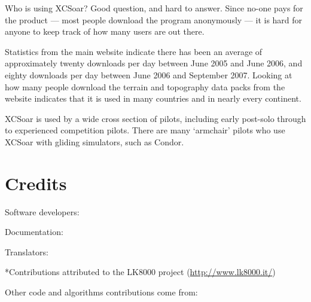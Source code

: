 Who is using XCSoar?  Good question, and hard to answer.  Since no-one
pays for the product --- most people download the program anonymously
--- it is hard for anyone to keep track of how many users are out
there.

Statistics from the main website indicate there has been an average of
approximately twenty downloads per day between June 2005 and June
2006, and eighty downloads per day between June 2006 and September
2007.  Looking at how many people download the terrain and topography
data packs from the website indicates that it is used in many
countries and in nearly every continent.

XCSoar is used by a wide cross section of pilots, including early
post-solo through to experienced competition pilots.  There are many
`armchair' pilots who use XCSoar with gliding simulators, such as
Condor.


\section{Credits}\label{sec:credits}

Software developers:
\begin{itemize}
  
\end{itemize}


Documentation:
\begin{itemize}
  
\end{itemize}


Translators:
\begin{itemize}
  
\end{itemize}
*Contributions attributed to the LK8000 project (\url{http://www.lk8000.it/})


Other code and algorithms contributions come from:
\begin{description}
  
\end{description}

